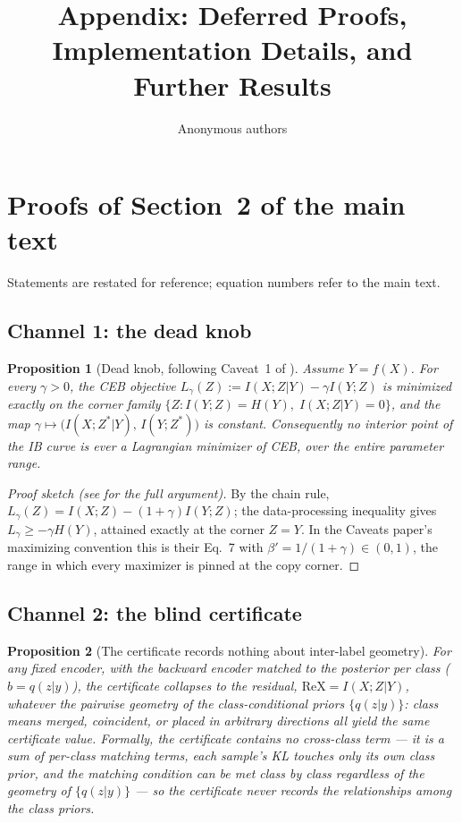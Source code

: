 \documentclass{article}
\title{Appendix: Deferred Proofs, Implementation Details, and Further Results}
\author{Anonymous authors}
\theoremstyle{plain}
\newtheorem{proposition}{Proposition}[section]
\theoremstyle{remark}
\begin{document}
\maketitle

\section{Proofs of Section~2 of the main text}
\label{app:proofs}

Statements are restated for reference; equation numbers refer to the main text.

\subsection{Channel 1: the dead knob}

\begin{proposition}[Dead knob, following Caveat~1 of \citet{kolchinsky2019caveats}]
\label{prop:dead}
Assume $Y = f(X)$. For every $\gamma > 0$, the CEB objective
$L_\gamma(Z) := I(X;Z|Y) - \gamma I(Y;Z)$ is minimized exactly on the corner family
$\{Z : I(Y;Z) = H(Y),\; I(X;Z|Y) = 0\}$, and the map
$\gamma \mapsto \bigl(I(X;Z^*|Y),\, I(Y;Z^*)\bigr)$ is constant. Consequently no
interior point of the IB curve is ever a Lagrangian minimizer of CEB, over the entire
parameter range.
\end{proposition}

\begin{proof}[Proof sketch (see \citet{kolchinsky2019caveats} for the full argument)]
By the chain rule, $L_\gamma(Z) = I(X;Z) - (1+\gamma)I(Y;Z)$; the data-processing
inequality gives $L_\gamma \ge -\gamma H(Y)$, attained exactly at the corner
$Z = Y$. In the Caveats paper's maximizing convention this is their Eq.~7 with
$\beta' = 1/(1+\gamma) \in (0,1)$, the range in which every maximizer is pinned at the
copy corner.
\end{proof}

\subsection{Channel 2: the blind certificate}

\begin{proposition}[The certificate records nothing about inter-label geometry]
\label{prop:geom-blind}
For any \emph{fixed} encoder, with the backward encoder matched to the posterior per
class ($b = q(z|y)$), the certificate collapses to the residual,
$\mathrm{ReX} = I(X;Z|Y)$, whatever the pairwise geometry of the class-conditional
priors $\{q(z|y)\}$: class means merged, coincident, or placed in arbitrary
directions all yield the same certificate value. Formally, the \emph{certificate}
contains no cross-class term --- it is a sum of per-class matching terms, each
sample's KL touches only its own class prior, and the matching condition can be met
class by class regardless of the geometry of $\{q(z|y)\}$ --- so the certificate never
records the relationships among the class priors.
\end{proposition}
\end{document}
